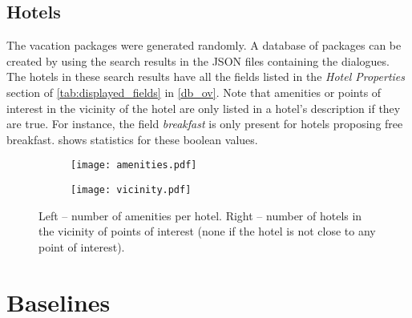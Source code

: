 \documentclass{article}
\theoremstyle{definition}
\begin{document}
\subsection{Hotels}
The vacation packages were generated randomly. A database of packages can be created by using the search results in the JSON files containing the dialogues. The hotels in these search results have all the fields listed in the \textit{Hotel Properties} section of \cref{tab:displayed_fields} in \cref{db_ov}. Note that amenities or points of interest in the vicinity of the hotel are only listed in a hotel's description if they are true. For instance, the field \textit{breakfast} is only present for hotels proposing free breakfast.  shows statistics for these boolean values.

\begin{figure}[!h]
	\begin{center}
    \begin{subfigure}[b]{0.47\textwidth}
        \texttt{[image: amenities.pdf]}
        \label{fig:amenities}
        \vspace{0.2cm}
    \end{subfigure}
    \begin{subfigure}[b]{0.47\textwidth}
        \texttt{[image: vicinity.pdf]}
        \label{fig:vicinity}
        \vspace{0.2cm}
    \end{subfigure}
    \caption{Left -- number of amenities per hotel. Right -- number of hotels in the vicinity of points of interest (none if the hotel is not close to any point of interest).}
    \label{fig:hotels_stats}
    \end{center}
\end{figure}   

\section{Baselines}
\end{document}
